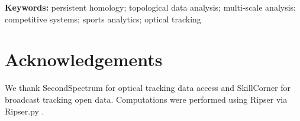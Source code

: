 \documentclass[11pt,a4paper]{article}
\begin{document}
\medskip
\noindent\textbf{Keywords:} persistent homology; topological data analysis; multi-scale analysis; competitive systems; sports analytics; optical tracking







\section*{Acknowledgements}

We thank SecondSpectrum for optical tracking data access and SkillCorner for broadcast tracking open data. Computations were performed using Ripser \citep{Bauer2021} via Ripser.py \citep{Tralie2018}.



\end{document}
